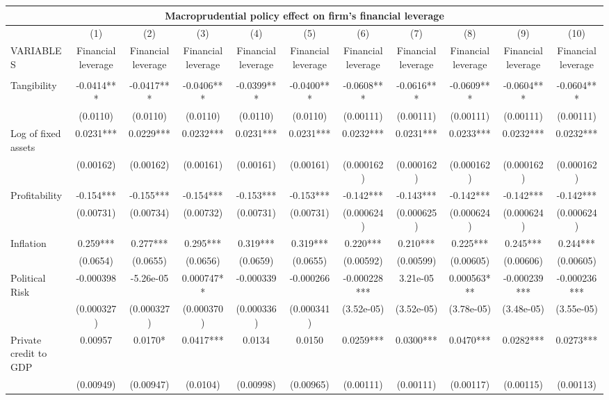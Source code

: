 \begin{tabular}{lcccccccccc}
\multicolumn{11}{c}{Macroprudential policy effect on firm's financial leverage} \\ \hline
 & (1) & (2) & (3) & (4) & (5) & (6) & (7) & (8) & (9) & (10) \\
VARIABLES & Financial leverage & Financial leverage & Financial leverage & Financial leverage & Financial leverage & Financial leverage & Financial leverage & Financial leverage & Financial leverage & Financial leverage \\ \hline
 &  &  &  &  &  &  &  &  &  &  \\
Tangibility & -0.0414*** & -0.0417*** & -0.0406*** & -0.0399*** & -0.0400*** & -0.0608*** & -0.0616*** & -0.0609*** & -0.0604*** & -0.0604*** \\
 & (0.0110) & (0.0110) & (0.0110) & (0.0110) & (0.0110) & (0.00111) & (0.00111) & (0.00111) & (0.00111) & (0.00111) \\
Log of fixed assets & 0.0231*** & 0.0229*** & 0.0232*** & 0.0231*** & 0.0231*** & 0.0232*** & 0.0231*** & 0.0233*** & 0.0232*** & 0.0232*** \\
 & (0.00162) & (0.00162) & (0.00161) & (0.00161) & (0.00161) & (0.000162) & (0.000162) & (0.000162) & (0.000162) & (0.000162) \\
Profitability & -0.154*** & -0.155*** & -0.154*** & -0.153*** & -0.153*** & -0.142*** & -0.143*** & -0.142*** & -0.142*** & -0.142*** \\
 & (0.00731) & (0.00734) & (0.00732) & (0.00731) & (0.00731) & (0.000624) & (0.000625) & (0.000624) & (0.000624) & (0.000624) \\
Inflation & 0.259*** & 0.277*** & 0.295*** & 0.319*** & 0.319*** & 0.220*** & 0.210*** & 0.225*** & 0.245*** & 0.244*** \\
 & (0.0654) & (0.0655) & (0.0656) & (0.0659) & (0.0655) & (0.00592) & (0.00599) & (0.00605) & (0.00606) & (0.00605) \\
Political Risk & -0.000398 & -5.26e-05 & 0.000747** & -0.000339 & -0.000266 & -0.000228*** & 3.21e-05 & 0.000563*** & -0.000239*** & -0.000236*** \\
 & (0.000327) & (0.000327) & (0.000370) & (0.000336) & (0.000341) & (3.52e-05) & (3.52e-05) & (3.78e-05) & (3.48e-05) & (3.55e-05) \\
Private credit to GDP & 0.00957 & 0.0170* & 0.0417*** & 0.0134 & 0.0150 & 0.0259*** & 0.0300*** & 0.0470*** & 0.0282*** & 0.0273*** \\
 & (0.00949) & (0.00947) & (0.0104) & (0.00998) & (0.00965) & (0.00111) & (0.00111) & (0.00117) & (0.00115) & (0.00113) \\

\end{tabular}
